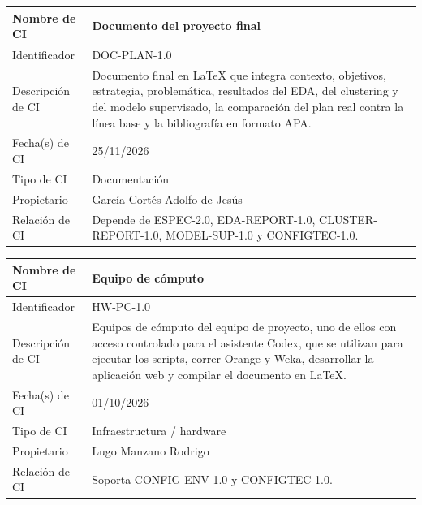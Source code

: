 \documentclass[letterpaper,11pt]{article}
\begin{document}
\noindent\begin{minipage}{\textwidth}
\small\renewcommand{\arraystretch}{1.9}
\begin{tabularx}{\textwidth}{|p{3.3cm}|Y|}
\hline
Nombre de CI & Documento del proyecto final \\ \hline
Identificador & DOC-PLAN-1.0 \\ \hline
Descripción de CI & Documento final en LaTeX que integra contexto, objetivos, estrategia, problemática, resultados del EDA, del clustering y del modelo supervisado, la comparación del plan real contra la línea base y la bibliografía en formato APA. \\ \hline
Fecha(s) de CI & 25/11/2026 \\ \hline
Tipo de CI & Documentación \\ \hline
Propietario & García Cortés Adolfo de Jesús \\ \hline
Relación de CI & Depende de ESPEC-2.0, EDA-REPORT-1.0, CLUSTER-REPORT-1.0, MODEL-SUP-1.0 y CONFIGTEC-1.0. \\ \hline
\end{tabularx}
\end{minipage}\par\bigskip
\noindent\begin{minipage}{\textwidth}
\small\renewcommand{\arraystretch}{1.9}
\begin{tabularx}{\textwidth}{|p{3.3cm}|Y|}
\hline
Nombre de CI & Equipo de cómputo \\ \hline
Identificador & HW-PC-1.0 \\ \hline
Descripción de CI & Equipos de cómputo del equipo de proyecto, uno de ellos con acceso controlado para el asistente Codex, que se utilizan para ejecutar los scripts, correr Orange y Weka, desarrollar la aplicación web y compilar el documento en LaTeX. \\ \hline
Fecha(s) de CI & 01/10/2026 \\ \hline
Tipo de CI & Infraestructura / hardware \\ \hline
Propietario & Lugo Manzano Rodrigo \\ \hline
Relación de CI & Soporta CONFIG-ENV-1.0 y CONFIGTEC-1.0. \\ \hline
\end{tabularx}
\end{minipage}\par\bigskip
\end{document}
